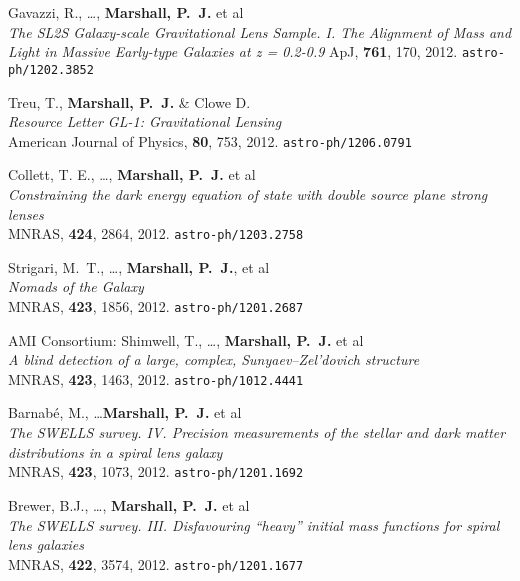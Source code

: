 \begin{revnumerate}
\item{{Gavazzi}, R., \ldots, \textbf{Marshall, P.~J.} et al\\
\textit{The SL2S Galaxy-scale Gravitational Lens Sample. I. The Alignment of Mass and Light in Massive Early-type Galaxies at z = 0.2-0.9}
ApJ, \textbf{761}, 170, 2012.
\texttt{astro-ph/1202.3852}
}


\item{{Treu}, T., \textbf{{Marshall}, P.~J.} \& Clowe D.\\
\textit{Resource Letter GL-1: Gravitational Lensing}\\
American Journal of Physics, \textbf{80}, 753, 2012.
\texttt{astro-ph/1206.0791}
}

\item{{Collett}, T. E., \ldots, \textbf{{Marshall}, P.~J.} et al\\
\textit{Constraining the dark energy equation of state with double source plane strong lenses}\\
MNRAS, \textbf{424}, 2864, 2012.
\texttt{astro-ph/1203.2758}
}

\item{{Strigari}, M.~T., \ldots, \textbf{{Marshall}, P.~J.}, et al\\
\textit{Nomads of the Galaxy}\\
MNRAS, \textbf{423}, 1856, 2012.
\texttt{astro-ph/1201.2687}
}

\item{{AMI Consortium}: {Shimwell}, T., \ldots, \textbf{{Marshall}, P.~J.} et al\\
\textit{A blind detection of a large, complex, Sunyaev--Zel'dovich structure}\\
MNRAS, \textbf{423}, 1463, 2012.
\texttt{astro-ph/1012.4441}
}

\item{{Barnab\'e}, M., \ldots \textbf{{Marshall}, P.~J.} et al\\
\textit{The SWELLS survey. IV. Precision measurements of the stellar and dark matter distributions in a spiral lens galaxy}\\
MNRAS, \textbf{423}, 1073, 2012.
\texttt{astro-ph/1201.1692}
}

\item{{Brewer}, B.J., \ldots, \textbf{{Marshall}, P.~J.} et al\\
\textit{The SWELLS survey. III. Disfavouring ``heavy'' initial mass functions for spiral lens galaxies}\\
MNRAS, \textbf{422}, 3574, 2012.
\texttt{astro-ph/1201.1677}
}


\end{revnumerate}

